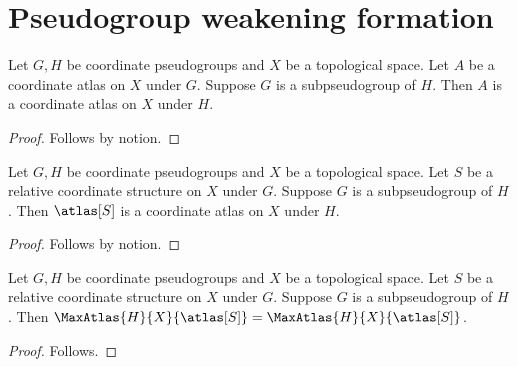 \section{Pseudogroup weakening formation}



\begin{theorem}\label{atlas_weakening_formation_control}
    Let $G,H$ be coordinate pseudogroups and $X$ be a topological space.
    Let $A$ be a coordinate atlas on $X$ under $G$.
    Suppose $G$ is a subpseudogroup of $H$.
    Then $A$ is a coordinate atlas on $X$ under $H$.
\end{theorem}
\begin{proof}
    Follows by notion.
\end{proof}

\begin{theorem}\label{relative_atlas_weakening_formation_control}
    Let $G,H$ be coordinate pseudogroups and $X$ be a topological space.
    Let $S$ be a relative coordinate structure on $X$ under $G$.
    Suppose $G$ is a subpseudogroup of $H$.
    Then $\atlas[S]$ is a coordinate atlas on $X$ under $H$.
\end{theorem}
\begin{proof}
    Follows by notion.
\end{proof}

\begin{theorem}\label{relative_atlas_weakening_guard_consumer}
    Let $G,H$ be coordinate pseudogroups and $X$ be a topological space.
    Let $S$ be a relative coordinate structure on $X$ under $G$.
    Suppose $G$ is a subpseudogroup of $H$.
    Then $\MaxAtlas{H}{X}{\atlas[S]}=\MaxAtlas{H}{X}{\atlas[S]}$.
\end{theorem}
\begin{proof}
    Follows.
\end{proof}
